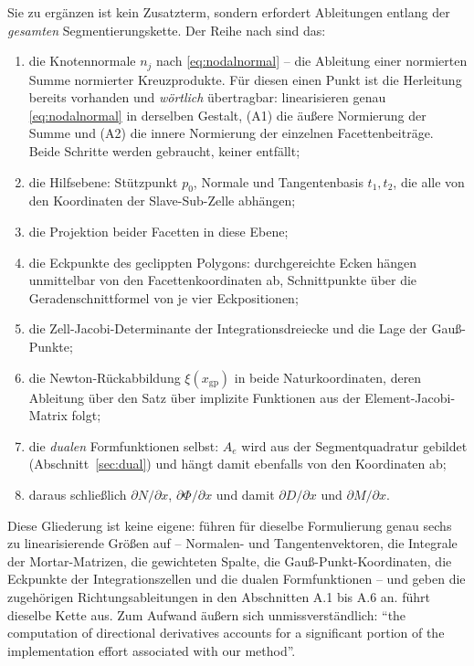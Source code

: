 \documentclass[a4paper,11pt]{article}
\def\bm#1{#1}%
\begin{document}
Sie zu ergänzen ist kein Zusatzterm, sondern erfordert Ableitungen entlang der \emph{gesamten}
Segmentierungskette. Der Reihe nach sind das:
\begin{enumerate}\itemsep2pt
  \item die Knotennormale $\bm n_j$ nach \eqref{eq:nodalnormal} -- die Ableitung einer normierten
        Summe normierter Kreuzprodukte. Für diesen einen Punkt ist die Herleitung bereits
        vorhanden und \emph{wörtlich} übertragbar: \citet[Gl.~(A1)--(A2)]{popp2010} linearisieren
        genau \eqref{eq:nodalnormal} in derselben Gestalt, (A1) die äußere Normierung der Summe
        und (A2) die innere Normierung der einzelnen Facettenbeiträge. Beide Schritte werden
        gebraucht, keiner entfällt;
  \item die Hilfsebene: Stützpunkt $\bm p_0$, Normale und Tangentenbasis $\bm t_1,\bm t_2$, die
        alle von den Koordinaten der Slave-Sub-Zelle abhängen;
  \item die Projektion beider Facetten in diese Ebene;
  \item die Eckpunkte des geclippten Polygons: durchgereichte Ecken hängen unmittelbar von den
        Facettenkoordinaten ab, Schnittpunkte über die Geradenschnittformel von je vier
        Eckpositionen;
  \item die Zell-Jacobi-Determinante der Integrationsdreiecke und die Lage der Gauß-Punkte;
  \item die Newton-Rückabbildung $\bm\xi(\bm x_{\text{gp}})$ in beide Naturkoordinaten, deren
        Ableitung über den Satz über implizite Funktionen aus der Element-Jacobi-Matrix folgt;
  \item die \emph{dualen} Formfunktionen selbst: $\bm A_e$ wird aus der Segmentquadratur gebildet
        (Abschnitt~\ref{sec:dual}) und hängt damit ebenfalls von den Koordinaten ab;
  \item daraus schließlich $\partial N/\partial\bm x$, $\partial\Phi/\partial\bm x$ und damit
        $\partial\bm D/\partial\bm x$ und $\partial\bm M/\partial\bm x$.
\end{enumerate}
Diese Gliederung ist keine eigene: \citet[Anh.~A]{popp2010} führen für dieselbe Formulierung
genau sechs zu linearisierende Größen auf -- Normalen- und Tangentenvektoren, die Integrale der
Mortar-Matrizen, die gewichteten Spalte, die Gauß-Punkt-Koordinaten, die Eckpunkte der
Integrationszellen und die dualen Formfunktionen -- und geben die zugehörigen Richtungsableitungen
in den Abschnitten A.1 bis A.6 an. \citet[Kap.~4]{farah} führt dieselbe Kette aus. Zum Aufwand
äußern sich \citet[Anh.~A]{popp2010} unmissverständlich: ``the computation of directional
derivatives accounts for a significant portion of the implementation effort associated with our
method''.
\end{document}
